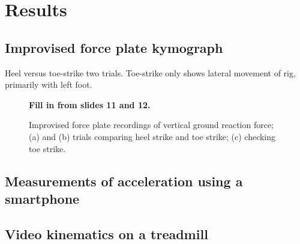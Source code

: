 \section{Results}
\label{sec:results}

\subsection{Improvised force plate kymograph}
Heel versus toe-strike two trials. Toe-strike only shows lateral movement of rig, primarily with left foot. 
\begin{figure}
\begin{center}
\textbf{Fill in from slides 11 and 12.}
\end{center}
\caption{Improvised force plate recordings of vertical ground reaction force; (a) and (b) trials comparing heel strike and toe strike; (c) checking toe strike.}
\label{fig:results:forceplate}
\end{figure}

\subsection{Measurements of acceleration using a smartphone}

\subsection{Video kinematics on a treadmill}
